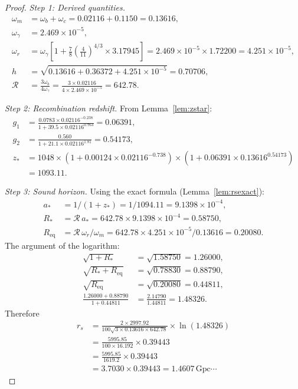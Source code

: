 \documentclass[12pt]{article}
\theoremstyle{plain}
\theoremstyle{definition}
\numberwithin{equation}{section}
\begin{document}
\begin{proof}
\emph{Step 1: Derived quantities.}
\begin{align}
\omega_m &= \omega_b+\omega_c = 0.02116+0.1150 = 0.13616,\\
\omega_\gamma &= 2.469\times10^{-5},\\
\omega_r &= \omega_\gamma\left[1+\frac{7}{8}\left(\frac{4}{11}\right)^{4/3}\times3.17945\right]
= 2.469\times10^{-5}\times1.72200 = 4.251\times10^{-5},\\
h &= \sqrt{0.13616+0.36372+4.251\times10^{-5}} = 0.70706,\\
\mathcal{R} &= \frac{3\omega_b}{4\omega_\gamma} = \frac{3\times0.02116}{4\times2.469\times10^{-5}} = 642.78.
\end{align}

\emph{Step 2: Recombination redshift.}
From Lemma~\ref{lem:zstar}:
\begin{align}
g_1 &= \frac{0.0783\times0.02116^{-0.238}}{1+39.5\times0.02116^{0.763}} = 0.06391,\\
g_2 &= \frac{0.560}{1+21.1\times0.02116^{1.81}} = 0.54173,\\
z_* &= 1048\times(1+0.00124\times0.02116^{-0.738})\times(1+0.06391\times0.13616^{0.54173})\\
&= 1093.11.
\end{align}

\emph{Step 3: Sound horizon.}
Using the exact formula (Lemma~\ref{lem:rsexact}):
\begin{align}
a_* &= 1/(1+z_*) = 1/1094.11 = 9.1398\times10^{-4},\\
R_* &= \mathcal{R}\,a_* = 642.78\times9.1398\times10^{-4} = 0.58750,\\
R_{\mathrm{eq}} &= \mathcal{R}\,\omega_r/\omega_m = 642.78\times4.251\times10^{-5}/0.13616 = 0.20080.
\end{align}
The argument of the logarithm:
\begin{align}
\sqrt{1+R_*} &= \sqrt{1.58750} = 1.26000,\\
\sqrt{R_*+R_{\mathrm{eq}}} &= \sqrt{0.78830} = 0.88790,\\
\sqrt{R_{\mathrm{eq}}} &= \sqrt{0.20080} = 0.44811,\\
\frac{1.26000+0.88790}{1+0.44811} &= \frac{2.14790}{1.44811} = 1.48326.
\end{align}
Therefore
\begin{align}
r_s &= \frac{2\times2997.92}{100\sqrt{3\times0.13616\times642.78}}\times\ln(1.48326)\\
&= \frac{5995.85}{100\times16.192}\times0.39443\\
&= \frac{5995.85}{1619.2}\times0.39443\\
&= 3.7030\times0.39443 = 1.4607\,\mathrm{Gpc}\cdots
\end{align}


\end{proof}
\end{document}
